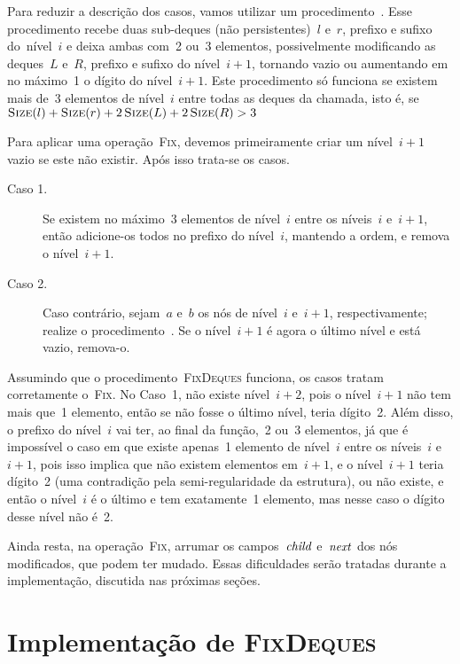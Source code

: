 \documentclass[../../main.tex]{subfiles}
\begin{document}
Para reduzir a descrição dos casos, vamos utilizar um procedimento~. Esse procedimento recebe duas sub-deques (não persistentes)~$l$ e~$r$, prefixo e sufixo do~nível~$i$ e deixa ambas com~2 ou~3 elementos, possivelmente modificando as deques~$L$ e~$R$, prefixo e sufixo do nível~$i+1$, tornando vazio ou aumentando em no máximo~1 o dígito do nível~$i+1$. Este procedimento só funciona se existem mais de~3 elementos de nível~$i$ entre todas as deques da chamada, isto é, se~${\Call{Size}{l} + \Call{Size}{r} + 2\,\Call{Size}{L} + 2\,\Call{Size}{R} > 3}$

Para aplicar uma operação~\textsc{Fix}, devemos primeiramente criar um nível~$i+1$ vazio se este não existir. Após isso trata-se os casos.

\begin{description}
    \item[Caso 1.] Se existem no máximo~3 elementos de nível~$i$ entre os níveis~$i$ e~$i+1$, então adicione-os todos no prefixo do nível~$i$, mantendo a ordem, e remova o nível~$i+1$.
    \item[Caso 2.] Caso contrário, sejam~$a$ e~$b$ os nós de nível~$i$ e~$i+1$, respectivamente; realize o procedimento~. Se o nível~$i+1$ é agora o último nível e está vazio, remova-o.
\end{description}

Assumindo que o procedimento~\textsc{FixDeques} funciona, os casos tratam corretamente o~\textsc{Fix}. No Caso~1, não existe nível~$i+2$, pois o nível~$i+1$ não tem mais que~1 elemento, então se não fosse o último nível, teria dígito~2. Além disso, o prefixo do nível~$i$ vai ter, ao final da função,~2 ou~3 elementos, já que é impossível o caso em que existe apenas~1 elemento de nível~$i$ entre os níveis~$i$ e~$i+1$, pois isso implica que não existem elementos em~$i+1$, e o nível~$i+1$ teria dígito~2 (uma contradição pela semi-regularidade da estrutura), ou não existe, e então o nível~$i$ é o último e tem exatamente~1 elemento, mas nesse caso o dígito desse nível não é~2.

Ainda resta, na operação~\textsc{Fix}, arrumar os campos~$\mathit{child}$ e~$\mathit{next}$ dos nós modificados, que podem ter mudado. Essas dificuldades serão tratadas durante a implementação, discutida nas próximas seções.

\section{Implementação de {\normalfont \textsc{FixDeques}}} \label{sec:fix_deques}
\end{document}
